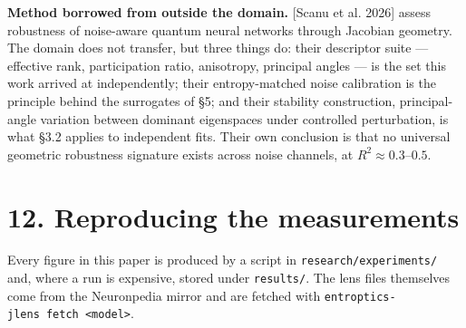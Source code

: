 \documentclass[10pt,letterpaper,twocolumn]{article}
\begin{document}
\textbf{Method borrowed from outside the domain.} {[}Scanu et al. 2026{]} assess robustness of noise-aware
quantum neural networks through Jacobian geometry. The domain does not transfer, but three things
do: their descriptor suite --- effective rank, participation ratio, anisotropy, principal angles --- is
the set this work arrived at independently; their entropy-matched noise calibration is the
principle behind the surrogates of §5; and their stability construction, principal-angle variation
between dominant eigenspaces under controlled perturbation, is what §3.2 applies to independent
fits. Their own conclusion is that no universal geometric robustness signature exists across noise
channels, at \(R^2\approx0.3\)--\(0.5\).

\section{12. Reproducing the measurements}\label{12-reproducing-the-measurements}

Every figure in this paper is produced by a script in \texttt{research/\allowbreak{}experiments/\allowbreak{}} and, where a run is
expensive, stored under \texttt{results/\allowbreak{}}. The lens files themselves come from the Neuronpedia mirror and
are fetched with \texttt{entroptics-{}\allowbreak{}jlens\ fetch\ \textless{}\allowbreak{}model\textgreater{}\allowbreak{}}.
\end{document}
